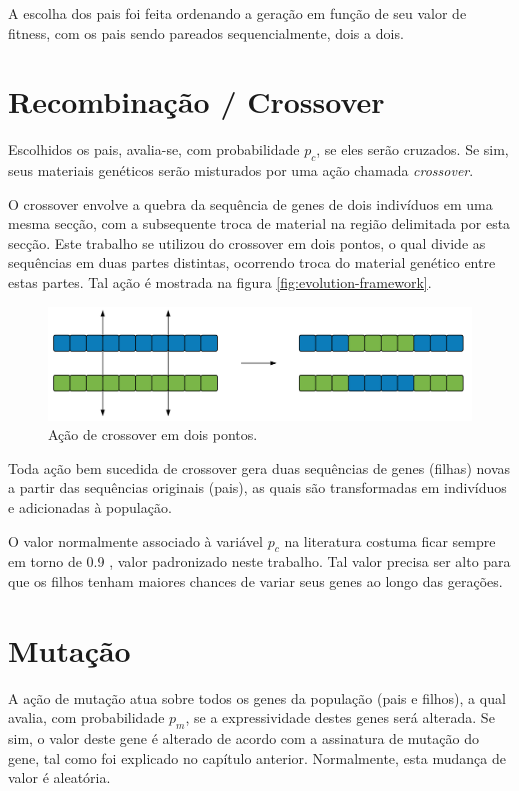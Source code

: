 A escolha dos pais foi feita ordenando a geração em função de seu valor de fitness, com os pais sendo pareados sequencialmente, dois a dois.

\section{Recombinação / Crossover}

Escolhidos os pais, avalia-se, com probabilidade $p_c$, se eles serão cruzados. Se sim, seus materiais genéticos serão misturados por uma ação chamada \emph{crossover}.

O crossover envolve a quebra da sequência de genes de dois indivíduos em uma mesma secção, com a subsequente troca de material na região delimitada por esta secção. Este trabalho se utilizou do crossover em dois pontos, o qual divide as sequências em duas partes distintas, ocorrendo troca do material genético entre estas partes. Tal ação é mostrada na figura \ref{fig:evolution-framework}.

\begin{figure}[ht!]
    \centering \includegraphics[width=1.0\textwidth]{crossover.png}
    \caption{Ação de crossover em dois pontos.}
    \label{fig:crossover}
\end{figure}

Toda ação bem sucedida de crossover gera duas sequências de genes (filhas) novas a partir das sequências originais (pais), as quais são transformadas em indivíduos e adicionadas à população.

O valor normalmente associado à variável $p_c$ na literatura costuma ficar sempre em torno de 0.9 \cite{eiben2011parameter}, valor padronizado neste trabalho. Tal valor precisa ser alto para que os filhos tenham maiores chances de variar seus genes ao longo das gerações.

\section{Mutação}

A ação de mutação atua sobre todos os genes da população (pais e filhos), a qual avalia, com probabilidade $p_m$, se a expressividade destes genes será alterada. Se sim, o valor deste gene é alterado de acordo com a assinatura de mutação do gene, tal como foi explicado no capítulo anterior. Normalmente, esta mudança de valor é aleatória.


